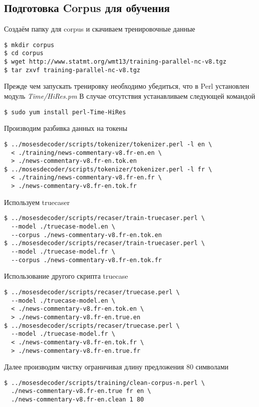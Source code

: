 \subsection{Подготовка Corpus для обучения}
Создаём папку для corpus и скачиваем тренировочные данные
\begin{lstlisting}
$ mkdir corpus
$ cd corpus
$ wget http://www.statmt.org/wmt13/training-parallel-nc-v8.tgz
$ tar zxvf training-parallel-nc-v8.tgz
\end{lstlisting}

Прежде чем запускать тренировку необходимо убедиться, что в Perl установлен модуль \emph{Time/HiRes.pm}
В случае отсутствия устанавливаем следующей командой
\begin{lstlisting}
$ sudo yum install perl-Time-HiRes
\end{lstlisting}

Производим разбивка данных на токены
\begin{lstlisting}
$ ../mosesdecoder/scripts/tokenizer/tokenizer.perl -l en \
  < ./training/news-commentary-v8.fr-en.en \
  > ./news-commentary-v8.fr-en.tok.en
$ ../mosesdecoder/scripts/tokenizer/tokenizer.perl -l fr \
  < ./training/news-commentary-v8.fr-en.fr \
  > ./news-commentary-v8.fr-en.tok.fr
\end{lstlisting}

Используем truecaser
\begin{lstlisting}
$ ../mosesdecoder/scripts/recaser/train-truecaser.perl \
  --model ./truecase-model.en \
  --corpus ./news-commentary-v8.fr-en.tok.en
$ ../mosesdecoder/scripts/recaser/train-truecaser.perl \
  --model ./truecase-model.fr \
  --corpus ./news-commentary-v8.fr-en.tok.fr
\end{lstlisting}

Использование другого скрипта truecase
\begin{lstlisting}
$ ../mosesdecoder/scripts/recaser/truecase.perl \
  --model ./truecase-model.en \
  < ./news-commentary-v8.fr-en.tok.en \
  > ./news-commentary-v8.fr-en.true.en
$ ../mosesdecoder/scripts/recaser/truecase.perl \
  --model ./truecase-model.fr \
  < ./news-commentary-v8.fr-en.tok.fr \
  > ./news-commentary-v8.fr-en.true.fr
\end{lstlisting}

Далее производим чистку ограничивая длину предложения 80 символами
\begin{lstlisting}
$ ../mosesdecoder/scripts/training/clean-corpus-n.perl \
  ./news-commentary-v8.fr-en.true fr en \
  ./news-commentary-v8.fr-en.clean 1 80
\end{lstlisting}

